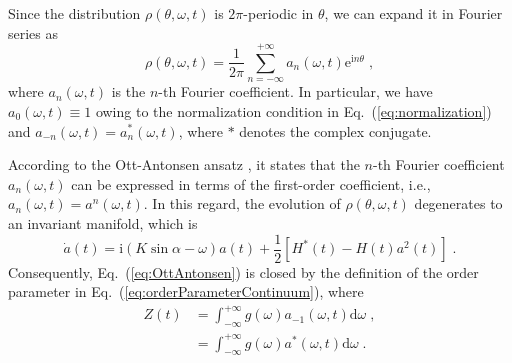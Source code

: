 \documentclass{article}
\begin{document}
Since the distribution $\rho \left( \theta ,\omega ,t \right)$ is $2\pi$-periodic in $\theta$, we can expand it in Fourier series as
\begin{equation}
    \rho \left( \theta ,\omega ,t \right) =\frac{1}{2\pi}\sum_{n=-\infty}^{+\infty}{a _n\left( \omega ,t \right) \mathrm{e}^{\mathrm{i}n\theta}}\;,
    \label{eq:rhoFourier}
\end{equation}
where $a _n\left( \omega ,t \right)$ is the $n$-th Fourier coefficient. In particular, we have $a _0\left( \omega ,t \right) \equiv 1$ owing to the normalization condition in Eq.~(\ref{eq:normalization}) and $a _{-n}\left( \omega ,t \right) =a _n^{*}\left( \omega ,t \right)$, where $*$ denotes the complex conjugate.

According to the Ott-Antonsen ansatz \cite{10.1063/1.2930766,10.1063/1.3136851}, it states that the $n$-th Fourier coefficient $a_n\left(\omega, t\right)$ can be expressed in terms of the first-order coefficient, i.e., $a_n\left(\omega, t\right) = a^{n}\left(\omega, t\right)$. In this regard, the evolution of $\rho\left(\theta, \omega, t\right)$ degenerates to an invariant manifold, which is
\begin{equation}
    \dot{a}\left( t \right) =\mathrm{i}\left( K\sin \alpha -\omega \right) a\left( t \right) +\frac{1}{2}\left[ H^{*}\left( t \right) -H\left( t \right) a^2\left( t \right) \right] \;.
    \label{eq:OttAntonsen}
\end{equation}
Consequently, Eq.~(\ref{eq:OttAntonsen}) is closed by the definition of the order parameter in Eq.~(\ref{eq:orderParameterContinuum}), where
\begin{equation}
    \begin{aligned}
        Z\left( t \right) &=\int_{-\infty}^{+\infty}{g\left( \omega \right) a_{-1}\left( \omega ,t \right) \mathrm{d}\omega} \;,\\
        &=\int_{-\infty}^{+\infty}{g\left( \omega \right) a^{*}\left( \omega ,t \right) \mathrm{d}\omega} \;.\\
    \end{aligned}
    \label{eq:orderParameterOttAntonsen}
\end{equation}
\end{document}
